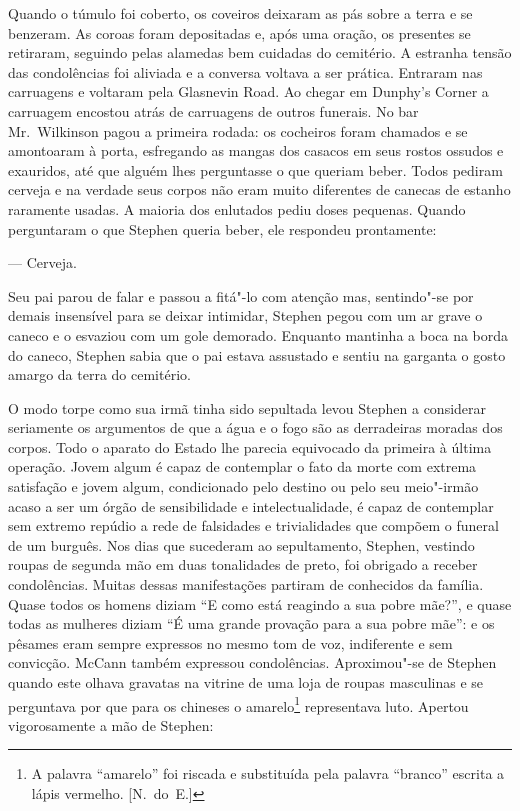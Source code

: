 Quando o túmulo foi coberto, os coveiros deixaram as pás sobre a terra e se
benzeram.  As coroas foram depositadas e, após uma oração, os presentes se
retiraram, seguindo pelas alamedas bem cuidadas do cemitério.  A estranha
tensão das condolências foi aliviada e a conversa voltava a ser prática.
Entraram nas carruagens e voltaram pela Glasnevin Road.  Ao chegar em Dunphy’s
Corner a carruagem encostou atrás de carruagens de outros funerais.  No bar 
Mr.~Wilkinson pagou a primeira rodada: os cocheiros foram chamados e se amontoaram
à porta, esfregando as mangas dos casacos em seus rostos ossudos e exauridos,
até que alguém lhes perguntasse o que queriam beber.  Todos pediram cerveja e
na verdade seus corpos não eram muito diferentes de canecas de estanho
raramente usadas.  A maioria dos enlutados pediu doses pequenas.  Quando
perguntaram o que Stephen queria beber, ele respondeu prontamente:

--- Cerveja.

Seu pai parou de falar e passou a fitá"-lo com atenção mas, sentindo"-se por
demais insensível para se deixar intimidar, Stephen pegou com um ar grave o
caneco e o esvaziou com um gole demorado.  Enquanto mantinha a boca na borda do
caneco, Stephen sabia que o pai estava assustado e sentiu na garganta o gosto
amargo da terra do cemitério.  

O modo torpe como sua irmã tinha sido sepultada levou Stephen a considerar
seriamente os argumentos de que a água e o fogo são as derradeiras moradas dos
corpos.  Todo o aparato do Estado lhe parecia equivocado da primeira à última
operação.  Jovem algum é capaz de contemplar o fato da morte com extrema
satisfação e jovem algum, condicionado pelo destino ou pelo seu meio"-irmão
acaso a ser um órgão de sensibilidade e intelectualidade, é capaz de contemplar
sem extremo repúdio a rede de falsidades e trivialidades que compõem o funeral
de um burguês.  Nos dias que sucederam ao sepultamento, Stephen, vestindo
roupas de segunda mão em \label{duas"-tonalidades} duas tonalidades de preto, foi obrigado a receber
condolências.  Muitas dessas manifestações partiram de conhecidos da família.
Quase todos os homens diziam “E como está reagindo a sua pobre mãe?”, e quase
todas as mulheres diziam “É uma grande provação para a sua pobre mãe”: e os
pêsames eram sempre expressos no mesmo tom de voz, indiferente e sem convicção.
McCann também expressou condolências.  Aproximou"-se de Stephen quando este
olhava gravatas na vitrine de uma loja de roupas masculinas e se perguntava por
que para os chineses o amarelo\footnote{ A palavra “amarelo” foi riscada e substituída
pela palavra “branco” escrita a lápis vermelho. [N.~do~E.]} representava luto.  Apertou
vigorosamente a mão de Stephen:

